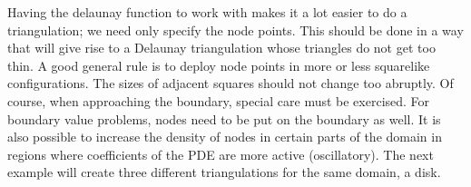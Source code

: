 \documentclass[../main.tex]{subfiles}
\begin{document}
Having the delaunay function to work with makes it a lot easier to do a triangulation; we need only specify the node points. This should be done in a way that will give rise to a Delaunay triangulation whose triangles do not get too thin. A good general rule is to deploy node points in more or less squarelike configurations. The sizes of adjacent squares should not change too abruptly. Of course, when approaching the boundary, special care must be exercised. For boundary value problems, nodes need to be put on the boundary as well. It is also possible to increase the density of nodes in certain parts of the domain in regions where coefficients of the PDE are more active (oscillatory). The next example will create three different triangulations for the same domain, a disk.
\\
\\
\end{document}
